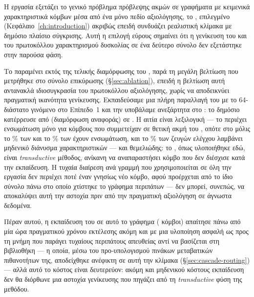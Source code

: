 Η εργασία εξετάζει το γενικό πρόβλημα πρόβλεψης ακμών σε γραφήματα με κειμενικά
χαρακτηριστικά κόμβων μέσα από ένα μόνο πεδίο αξιολόγησης, το ,
επιλεγμένο (Κεφάλαιο~\ref{ch:introduction}) ακριβώς επειδή συνδυάζει ρεαλιστική
κλίμακα με δημόσιο πλαίσιο σύγκρισης.
Αυτή η επιλογή εύρους σημαίνει ότι η
γενίκευση του  και του πρωτοκόλλου χαρακτηρισμού δυσκολίας σε ένα
δεύτερο σύνολο  δεν εξετάστηκε στην παρούσα φάση.

Το  παραμένει εκτός της τελικής διαμόρφωσης του , παρά τη
μεγάλη βελτίωση που μετρήθηκε στο σύνολο επικύρωσης (\S\ref{sec:ablation}), επειδή η
βελτίωση αυτή αντανακλά ιδιοσυγκρασία του πρωτοκόλλου αξιολόγησης, χωρίς να αποδεικνύει
πραγματική ικανότητα γενίκευσης.
Εκπαιδεύσαμε μια πλήρη παραλλαγή του  με το
64-διάστατο γινόμενο  στο Επίπεδο~1 και την υποβάλαμε ανεξάρτητα στο
: το δημόσιο  κατέρρευσε από \KaggleBaselinePublic{} (διαμόρφωση αναφοράς)
σε \NTwoVKagglePublic.
Η αιτία είναι λεξιλογική --- το \texttt{} περιέχει
ενσωμάτωση μόνο για κόμβους που συμμετείχαν σε θετική ακμή του
\texttt{}, οπότε στο \texttt{} μόλις το \NTwoVIdOneCoverage\% των
\texttt{} και το \NTwoVIdTwoCoverage\% των \texttt{} έχουν ενσωμάτωση, και το
\NTwoVZeroVecPct\% των ζευγών ελέγχου λαμβάνει μηδενικό διάνυσμα χαρακτηριστικών --- και
θεμελιώδης: το , όπως υλοποιήθηκε εδώ, είναι \textit{transductive}
μέθοδος, ανίκανη να αναπαραστήσει κόμβο που δεν διέσχισε κατά την εκπαίδευση.
Η
τυχαία διαίρεση ανά γραμμή που χρησιμοποιείται σε όλη την εργασία δεν περιέχει
ποτέ έναν γνησίως νέο κόμβο, αφού προέρχεται από το ίδιο σύνολο πάνω στο οποίο
χτίστηκε το γράφημα περιπάτων --- δεν μπορεί, συνεπώς, να αποκαλύψει αυτή την αστοχία
πριν από την πραγματική αξιολόγηση σε άγνωστα δεδομένα.

Πέραν αυτού, η εκπαίδευση
του  σε αυτό το γράφημα (\GraphNodes{} κόμβοι) απαίτησε πάνω από μία ώρα
πραγματικού χρόνου εκτέλεσης ακόμη και με μια υλοποίηση ασφαλή ως προς τη μνήμη που
παράγει τυχαίους περιπάτους απευθείας αντί να βασίζεται στη βιβλιοθήκη  --- η οποία, μέσω του προ-υπολογισμού πινάκων μεταβατικών πιθανοτήτων της,
αποδείχθηκε ανέφικτη σε αυτή την κλίμακα (\S\ref{sec:cascade-routing}) --- αλλά αυτό
το κόστος είναι δευτερεύον: ακόμη και μηδενικού κόστους εκπαίδευση δεν θα διόρθωνε
μια αστοχία γενίκευσης που πηγάζει από τη \textit{transductive} φύση της μεθόδου.


